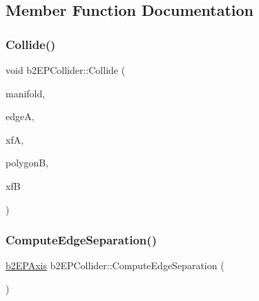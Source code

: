 \subsection{Member Function Documentation}
\mbox{\label{structb2_e_p_collider_a22f13698b4adde74b9bdb705f59f9778}} 
\subsubsection{\texorpdfstring{Collide()}{Collide()}}
{\footnotesize\ttfamily void b2\+E\+P\+Collider\+::\+Collide (\begin{DoxyParamCaption}\item[{\mbox{\hyperlink{structb2_manifold}{b2\+Manifold}} $\ast$}]{manifold,  }\item[{const \mbox{\hyperlink{classb2_edge_shape}{b2\+Edge\+Shape}} $\ast$}]{edgeA,  }\item[{const \mbox{\hyperlink{structb2_transform}{b2\+Transform}} \&}]{xfA,  }\item[{const \mbox{\hyperlink{classb2_polygon_shape}{b2\+Polygon\+Shape}} $\ast$}]{polygonB,  }\item[{const \mbox{\hyperlink{structb2_transform}{b2\+Transform}} \&}]{xfB }\end{DoxyParamCaption})}

\mbox{\label{structb2_e_p_collider_a105a28c48afe6dc4158e6d5d303bf5e1}} 
\subsubsection{\texorpdfstring{ComputeEdgeSeparation()}{ComputeEdgeSeparation()}}
{\footnotesize\ttfamily \mbox{\hyperlink{structb2_e_p_axis}{b2\+E\+P\+Axis}} b2\+E\+P\+Collider\+::\+Compute\+Edge\+Separation (\begin{DoxyParamCaption}{ }\end{DoxyParamCaption})}

\mbox{\label{structb2_e_p_collider_a46c340d43b25b776db8356c5b0249002}} 
